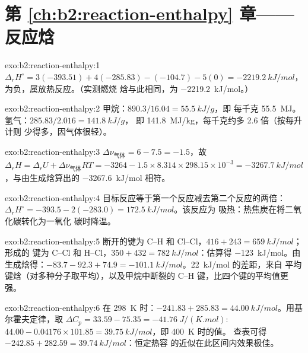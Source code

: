 \section*{第 \ref{ch:b2:reaction-enthalpy} 章——反应焓}

\begin{solution}{exo:b2:reaction-enthalpy:1}
$\Delta_r H^\circ = 3(-393.51) + 4(-285.83) - (-104.7) - 5(0) =
\qty{-2219.2}{kJ/mol}$，为负，属放热反应。（实测燃烧
焓与此相同，为 \qty{-2219.2}{kJ/mol}。）
\end{solution}

\begin{solution}{exo:b2:reaction-enthalpy:2}
甲烷：$890.3/16.04 = \qty{55.5}{kJ/g}$，即
每千克 \qty{55.5}{MJ}。氢气：$285.83/2.016 = \qty{141.8}{kJ/g}$，
即 \qty{141.8}{MJ/kg}，每千克约多 2.6 倍（按每升计则
少得多，因气体很轻）。
\end{solution}

\begin{solution}{exo:b2:reaction-enthalpy:3}
$\Delta\nu_{\text{气体}} = 6 - 7.5 = -1.5$，故 $\Delta_r H = \Delta_r U +
\Delta\nu_{\text{气体}}RT = -3264 - 1.5 \times 8.314 \times 298.15 \times
10^{-3} = \qty{-3267.7}{kJ/mol}$，与由生成焓算出的
\qty{-3267.6}{kJ/mol} 相符。
\end{solution}

\begin{solution}{exo:b2:reaction-enthalpy:4}
目标反应等于第一个反应减去第二个反应的两倍：
$\Delta_r H^\circ = -393.5 - 2(-283.0) = \qty{+172.5}{kJ/mol}$。该反应为
吸热：热焦炭在将二氧化碳转化为一氧化
碳时降温。
\end{solution}

\begin{solution}{exo:b2:reaction-enthalpy:5}
断开的键为 C--H 和 Cl--Cl，$416 + 243 = \qty{659}{kJ/mol}$；形成的
键为 C--Cl 和 H--Cl，$350 + 432 = \qty{782}{kJ/mol}$：估算得
\qty{-123}{kJ/mol}。由生成焓得：$-83.7 - 92.3 + 74.9 =
\qty{-101.1}{kJ/mol}$。\qty{22}{kJ/mol} 的差距，来自
平均键焓（对多种分子取平均），以及甲烷中断裂的
C--H 键，比四个键的平均值更强。
\end{solution}

\begin{solution}{exo:b2:reaction-enthalpy:6}
在 \qty{298}{K} 时：$-241.83 + 285.83 = \qty{44.00}{kJ/mol}$。用基尔霍夫定律，取
$\Delta C_p = 33.59 - 75.35 = \qty{-41.76}{J/(K.mol)}$:
$44.00 - 0.04176 \times 101.85 = \qty{39.75}{kJ/mol}$，即 \qty{400}{K} 时的值。
查表可得 $-242.85 + 282.59 = \qty{39.74}{kJ/mol}$：恒定热容
的近似在此区间内效果极佳。
\end{solution}

